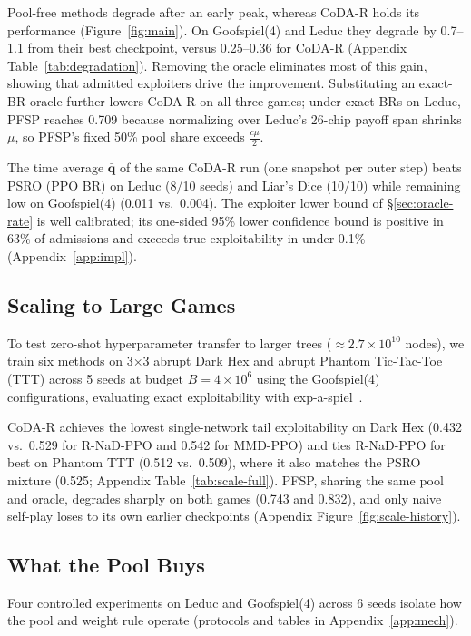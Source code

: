 \documentclass{article} %
\theoremstyle{plain}
\theoremstyle{remark}
\newcommand{\bq}{{\bm{q}}}
\newcommand{\codar}{CoDA-R}
\newcommand{\rnad}{R-NaD-PPO}
\begin{document}
Pool-free methods degrade after an early peak, whereas \codar{} holds its performance (Figure~\ref{fig:main}). On Goofspiel(4) and Leduc they degrade by 0.7--1.1 from their best checkpoint, versus 0.25--0.36 for \codar{} (Appendix Table~\ref{tab:degradation}). Removing the oracle eliminates most of this gain, showing that admitted exploiters drive the improvement. Substituting an exact-BR oracle further lowers \codar{} on all three games; under exact BRs on Leduc, PFSP reaches 0.709 because normalizing over Leduc's 26-chip payoff span shrinks $\mu$, so PFSP's fixed 50\% pool share exceeds $\tfrac{c\mu}2$.

The time average $\bar{\bq}$ of the same \codar{} run (one snapshot per outer step) beats PSRO (PPO BR) on Leduc (8/10 seeds) and Liar's Dice (10/10) while remaining low on Goofspiel(4) (0.011 vs.\ 0.004). The exploiter lower bound of \S\ref{sec:oracle-rate} is well calibrated; its one-sided 95\% lower confidence bound is positive in 63\% of admissions and exceeds true exploitability in under 0.1\% (Appendix~\ref{app:impl}).

\subsection{Scaling to Large Games}
\label{sec:exp-scale}

To test zero-shot hyperparameter transfer to larger trees ($\approx2.7\times10^{10}$ nodes), we train six methods on 3$\times$3 abrupt Dark Hex and abrupt Phantom Tic-Tac-Toe (TTT) across 5 seeds at budget $B=4\times10^6$ using the Goofspiel(4) configurations, evaluating exact exploitability with exp-a-spiel~\citep{rudolph2025reevaluating}.

\codar{} achieves the lowest single-network tail exploitability on Dark Hex (0.432 vs.\ 0.529 for \rnad{} and 0.542 for MMD-PPO) and ties \rnad{} for best on Phantom TTT (0.512 vs.\ 0.509), where it also matches the PSRO mixture (0.525; Appendix Table~\ref{tab:scale-full}). PFSP, sharing the same pool and oracle, degrades sharply on both games (0.743 and 0.832), and only naive self-play loses to its own earlier checkpoints (Appendix Figure~\ref{fig:scale-history}).

\subsection{What the Pool Buys}
\label{sec:exp-mech}

Four controlled experiments on Leduc and Goofspiel(4) across 6 seeds isolate how the pool and weight rule operate (protocols and tables in Appendix~\ref{app:mech}).
\end{document}
